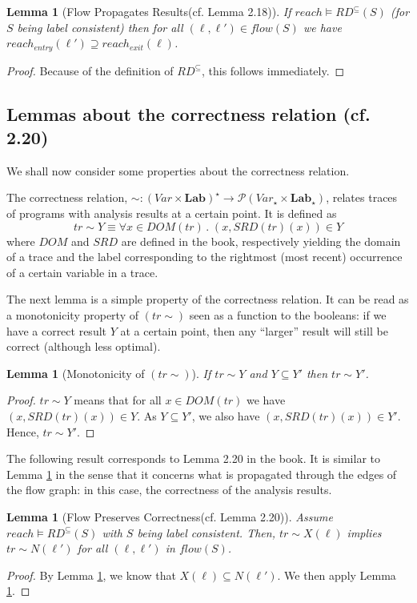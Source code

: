 \documentclass[a4wide,12pt]{article}
\theoremstyle{definition}
\theoremstyle{plain}
\newtheorem{lemma}[theo]{Lemma}
\theoremstyle{remark}
\def\pset#1{\mathcal{P}(#1)}
\def\Lab {\mathbf{Lab}}
\begin{document}
\begin{lemma}[Flow Propagates Results(cf. Lemma 2.18)]
\label{lem218}
If $reach \models RD^\subseteq(S)$ (for $S$ being label consistent) then for all
$(\ell, \ell') \in flow(S)$ we have $reach_{entry}(\ell') \supseteq reach_{exit}(\ell)$.
\end{lemma}
\begin{proof}
Because of the definition of $RD^\subseteq$, this follows
immediately.
\end{proof}

\subsection*{Lemmas about the correctness relation (cf. 2.20) }

We shall now consider some properties about the correctness relation.


The correctness relation, $\sim: (Var \times \Lab)^\star \to \pset{Var_\star \times \Lab_\star}$,
relates traces of programs with analysis results at a certain point. It is defined as
\[tr \sim Y \equiv \forall x \in DOM(tr) \,.\; (x,SRD(tr)(x)) \in Y\]
where $DOM$ and $SRD$ are defined in the book, respectively yielding
the domain of a trace and the label corresponding to the rightmost (most recent) 
occurrence of a certain variable in a trace.

The next lemma is a simple property of the correctness relation. It can be read as a monotonicity property
of $(tr \sim)$ seen as a function to the booleans: if we have a
correct result $Y$ at a certain point, then any ``larger'' result
will still be correct (although less optimal). 

\begin{lemma}[Monotonicity of $(tr \sim)$]
\label{lemmasq}
If $tr \sim Y$ and $Y \subseteq Y'$ then $tr \sim Y'$.
\end{lemma}
\begin{proof}
$tr \sim Y$ means that for all $x \in DOM (tr)$ we have $(x,SRD(tr)(x)) \in Y$. 
As $Y \subseteq Y'$, we also have $(x,SRD(tr)(x)) \in Y'$. Hence, $tr \sim Y'$.
\end{proof}

The following result corresponds to Lemma 2.20 in the book. 
It is similar to Lemma \ref{lem218} in the sense that it concerns what is propagated
through the edges of the flow graph: in this case, the correctness of the analysis results.

\begin{lemma}[Flow Preserves Correctness(cf. Lemma 2.20)]\label{lemmaflow}
Assume $reach \models RD^\subseteq(S)$ with $S$ being label consistent. Then,
$tr \sim X(\ell)$ implies $tr \sim N(\ell')$ for all $(\ell, \ell')$ in $flow(S)$.
\end{lemma}
\begin{proof}
By Lemma \ref{lem218}, we know that $X(\ell) \subseteq N(\ell')$. We then apply Lemma \ref{lemmasq}.
\end{proof}
\end{document}
